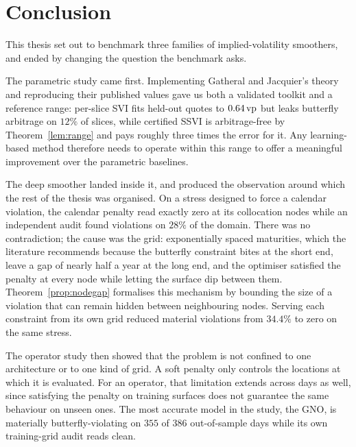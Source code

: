 \chapter{Conclusion}\label{ch:conclusion}

This thesis set out to benchmark three families of implied-volatility smoothers, and ended by
changing the question the benchmark asks.

The parametric study came first. Implementing Gatheral and Jacquier's theory and reproducing
their published values gave us both a validated toolkit and a reference range: per-slice SVI
fits held-out quotes to $0.64\,\text{vp}$ but leaks butterfly arbitrage on $12\%$ of slices, while
certified SSVI is arbitrage-free by Theorem~\ref{lem:range} and pays roughly three times the
error for it. Any learning-based method therefore needs to operate within this range to offer a
meaningful improvement over the parametric baselines.

The deep smoother landed inside it, and produced the observation around which the rest of the
thesis was organised. On a stress designed to force a calendar violation, the calendar penalty
read exactly zero at its collocation nodes while an independent audit found violations on $28\%$
of the domain. There was no contradiction; the cause was the grid: exponentially spaced
maturities, which the literature recommends because the butterfly constraint bites at the short
end, leave a gap of nearly half a year at the long end, and the optimiser satisfied the penalty
at every node while letting the surface dip between them. Theorem~\ref{prop:nodegap} formalises
this mechanism by bounding the size of a violation that can remain hidden between neighbouring
nodes. Serving each constraint from its own grid reduced material violations from $34.4\%$ to
zero on the same stress.

The operator study then showed that the problem is not confined to one architecture or to one
kind of grid. A soft penalty only controls the locations at which it is evaluated. For an
operator, that limitation extends across days as well, since satisfying the penalty on training
surfaces does not guarantee the same behaviour on unseen ones. The most accurate model in the
study, the GNO, is materially butterfly-violating on $355$ of $386$ out-of-sample days while its
own training-grid audit reads clean.

